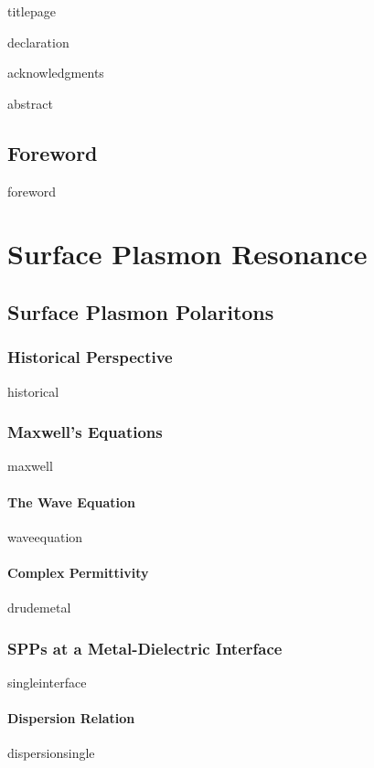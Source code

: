 \documentclass[a4paper,titlepage,onecolumn]{report}
\begin{document}
{titlepage}

{declaration}

{acknowledgments}

\tableofcontents

{abstract}



\chapter{Foreword} \label{ch:foreword}
{foreword}

\part{Surface Plasmon Resonance}
\chapter{Surface Plasmon Polaritons} \label{ch:existence}
 \section{Historical Perspective}
 {historical}
 \section{Maxwell's Equations}
 {maxwell}
  \subsection{The Wave Equation}
  {waveequation}
  \subsection{Complex Permittivity}
  {drudemetal}
 \section{SPPs at a Metal-Dielectric Interface}
 {singleinterface}
  \subsection{Dispersion Relation}
  {dispersionsingle}
\end{document}
